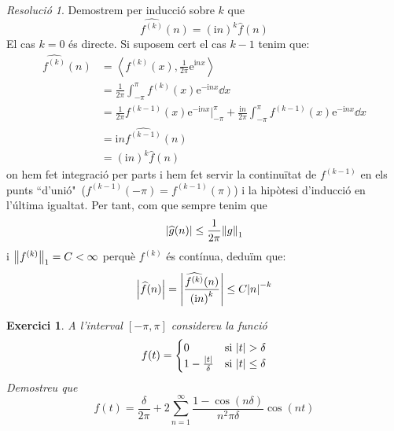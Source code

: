 \documentclass[10pt,a4paper]{article}
\newcommand{\ii}{\mathrm{i}} %
\newtheorem{exercici}{Exercici}
\theoremstyle{definition}
\theoremstyle{remark}
\newtheorem*{res}{Resolució}
\renewcommand{\exp}[1]{\mathrm{e}^{#1}} %
\begin{document}
\begin{res}
  Demostrem per inducció sobre $k$ que $$\widehat{f^{(k)}}(n)={(\ii n)}^k\widehat{f}(n)$$
  El cas $k=0$ és directe. Si suposem cert el cas $k-1$ tenim que:
  \begin{align*}
    \widehat{f^{(k)}}(n) & =\left\langle f^{(k)}(x),\frac{1}{2\pi}\exp{\ii nx}\right\rangle                                                               \\
                         & =\frac{1}{2\pi}\int_{-\pi}^\pi f^{(k)}(x)\exp{-\ii n x}\dd{x}                                                                  \\
                         & =\frac{1}{2\pi}f^{(k-1)}(x)\exp{-\ii n x}\Big|_{-\pi}^\pi + \frac{\ii n}{2\pi}\int_{-\pi}^\pi f^{(k-1)}(x)\exp{-\ii n x}\dd{x} \\
                         & =\ii n \widehat{f^{(k-1)}}(n)                                                                                                  \\
                         & ={(\ii n)}^k\widehat{f}(n)
  \end{align*}
  on hem fet integració per parts i hem fet servir la continuïtat de $f^{(k-1)}$ en els punts ``d'unió"\ ($f^{(k-1)}(-\pi)=f^{(k-1)}(\pi)$) i la hipòtesi d'inducció en l'última igualtat.
  Per tant, com que sempre tenim que $$\abs{\widehat{g}(n)}\leq\frac{1}{2\pi}\norm{g}_1$$ i $\norm{f^{(k)}}_1=C<\infty$ perquè $f^{(k)}$ és contínua, deduïm que:
  $$\abs{\widehat{f}(n)}=\abs{\frac{\widehat{f^{(k)}}(n)}{{(\ii n)}^k}}\leq C\abs{n}^{-k}$$
\end{res}
\begin{exercici}
  A l'interval $[-\pi, \pi]$ considereu la funció
  \begin{equation*}
    f(t)=\begin{cases}

      0                        & \text{si } \abs{t}>\delta    \\
      1-\frac{\abs{t}}{\delta} & \text{si } \abs{t}\leq\delta
    \end{cases}
  \end{equation*}
  Demostreu que $$f(t)=\frac{\delta}{2\pi}+2\sum_{n=1}^\infty\frac{1-\cos(n\delta)}{n^2\pi\delta}\cos(nt)$$
\end{exercici}
\end{document}
